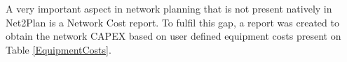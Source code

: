 %	
%	
%	
%	
%	
	
	A very important aspect in network planning that is not present natively in Net2Plan is a Network Cost report. To fulfil this gap, a report was created to obtain the network CAPEX based on user defined equipment costs present on Table \ref{EquipmentCosts}.
		
	\begin{table} [h]
		\centering
		\caption{Equipment Costs}			
		\label{EquipmentCosts}			
	\end{table}
	
